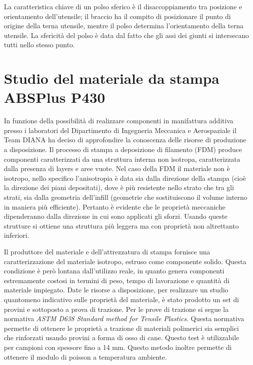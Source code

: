 \documentclass[%
corpo=11pt,
twoside,
 stile=classica,
oldstyle,
greek,%
]{toptesi}
\begin{document}
	La caratteristica chiave di un polso sferico è il disaccoppiamento tra posizione e orientamento dell'utensile; il braccio ha il compito di posizionare il punto di origine della terna utensile, mentre il polso determina l'orientamento della terna utensile.
	La sfericità del polso è data dal fatto che gli assi dei giunti si intersecano tutti nello stesso punto.
	
	
	\section{Studio del materiale da stampa ABSPlus P430}
	In funzione della possibilità di realizzare componenti in manifattura additiva presso i laboratori  del Dipartimento di Ingegneria Meccanica e Aerospaziale il Team DIANA ha deciso di approfondire la conoscenza delle risorse di produzione a disposizione. 
	Il processo di stampa a deposizione di filamento (FDM) produce componenti caratterizzati da una struttura interna non isotropa, caratterizzata dalla presenza di layers e aree vuote. Nel caso della FDM il materiale non è isotropo, nello specifico l’anisotropia è data sia dalla direzione della stampa (cioè la direzione dei piani depositati), dove è più resistente nello strato che tra gli strati, sia dalla geometria dell’infill (geometrie che sostituiscono il volume interno in maniera più efficiente).
	 Pertanto è evidente che le proprietà meccaniche dipenderanno dalla direzione in cui sono applicati gli sforzi. 
	 Usando queste strutture si ottiene una struttura più leggera ma con proprietà non altrettanto inferiori. 
	 
	
	Il produttore del materiale e dell'attrezzatura di stampa fornisce una caratterizzazione del materiale isotropo, estruso come componente solido. Questa condizione è però lontana dall'utilizzo reale, in quanto genera componenti estremamente costosi in termini di peso, tempo di lavorazione e quantità di materiale impiegato. 
	Date le risorse a disposizione, per realizzare un studio quantomeno indicativo sulle proprietà del materiale, è stato prodotto un set di provini e sottoposto a prova di trazione.
	Per le prove di trazione si segue la normativa \textit{ASTM D638 Standard method for Tensile Plastics}. Questa normativa permette di ottenere le proprietà a trazione di materiali polimerici sia semplici che rinforzati usando provini a forma di osso di cane. Questo test è utilizzabile per campioni con spessore fino a 14 mm. Questo metodo inoltre permette di ottenere il modulo di poisson a temperatura ambiente. 
	
\end{document}
